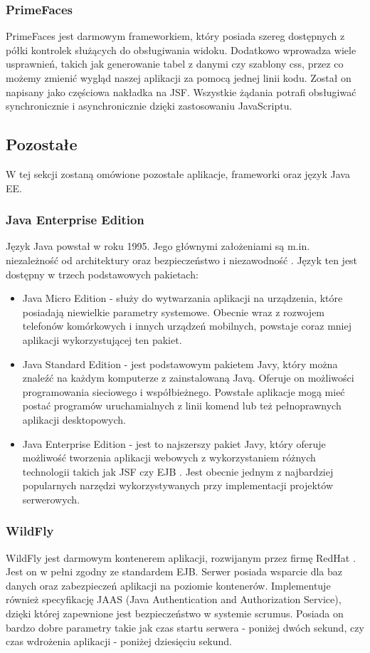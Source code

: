 \subsubsection{PrimeFaces}
PrimeFaces jest darmowym frameworkiem, który posiada szereg dostępnych z półki kontrolek służących do obsługiwania widoku. Dodatkowo wprowadza wiele usprawnień, takich jak generowanie tabel z danymi czy szablony css, przez co możemy zmienić wygląd naszej aplikacji za pomocą jednej linii kodu. Został on napisany jako częściowa nakładka na JSF. Wszystkie żądania potrafi obsługiwać synchronicznie i asynchronicznie dzięki zastosowaniu JavaScriptu.

\subsection{Pozostałe}
W tej sekcji zostaną omówione pozostałe aplikacje, frameworki oraz język Java EE.

\subsubsection{Java Enterprise Edition}
Język Java powstał w roku 1995. Jego głównymi założeniami są m.in. niezależność od architektury oraz bezpieczeństwo i niezawodność \cite{JAVA}. Język ten jest dostępny w trzech podstawowych pakietach:
\begin{itemize}
	\item Java Micro Edition - służy do wytwarzania aplikacji na urządzenia, które posiadają niewielkie parametry systemowe. Obecnie wraz z rozwojem telefonów komórkowych i innych urządzeń mobilnych, powstaje coraz mniej aplikacji wykorzystującej ten pakiet.
	\item Java Standard Edition - jest podstawowym pakietem Javy, który można znaleźć na każdym komputerze z zainstalowaną Javą. Oferuje on możliwości programowania sieciowego i współbieżnego. Powstałe aplikacje mogą mieć postać programów uruchamialnych z linii komend lub też pełnoprawnych aplikacji desktopowych.
	\item Java Enterprise Edition - jest to najszerszy pakiet Javy, który oferuje możliwość tworzenia aplikacji webowych z wykorzystaniem różnych technologii takich jak JSF czy EJB \cite{J2EE}\cite{EJB_3.0}. Jest obecnie jednym z najbardziej popularnych narzędzi wykorzystywanych przy implementacji projektów serwerowych.
\end{itemize}

\subsubsection{WildFly}
WildFly jest darmowym kontenerem aplikacji, rozwijanym przez firmę RedHat \cite{JBOSS_7}. Jest on w pełni zgodny ze standardem EJB. Serwer posiada wsparcie dla baz danych oraz zabezpieczeń aplikacji na poziomie kontenerów. Implementuje również specyfikację JAAS (Java Authentication and Authorization Service), dzięki której zapewnione jest bezpieczeństwo w systemie scrumus. Posiada on bardzo dobre parametry takie jak czas startu serwera - poniżej dwóch sekund, czy czas wdrożenia aplikacji - poniżej dziesięciu sekund.

